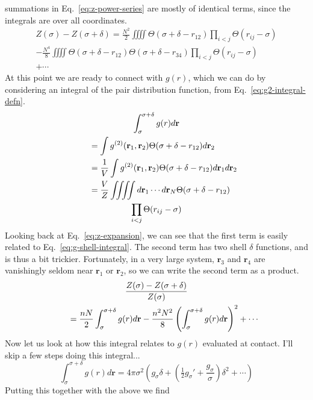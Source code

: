 \documentclass[letterpaper,twocolumn,amsmath,amssymb,pre,aps,10pt]{revtex4-1}
\newcommand{\rr}{\textbf{r}}
\begin{document}
summations in Eq.~\ref{eq:z-power-series} are mostly of identical
terms, since the integrals are over all coordinates.
\begin{multline}
  Z(\sigma)-Z(\sigma+\delta) =
  \frac{N^2}{2}\iiiint \Theta(\sigma+\delta-r_{12})
  \prod_{i<j} \Theta(r_{ij}-\sigma) \\
  - \frac{N^4}{8}\iiiint
  \Theta(\sigma+\delta-r_{12})
  \Theta(\sigma+\delta-r_{34})
  \prod_{i<j} \Theta(r_{ij}-\sigma) \\
  + \cdots \label{eq:z-expansion}
\end{multline}
At this point we are ready to connect with $g(r)$, which we can do by
considering an integral of the pair distribution function, from
Eq.~\ref{eq:g2-integral-defn}.
\begin{multline}
  \int_{\sigma}^{\sigma+\delta} g(r) d\rr\\
  \shoveleft{\quad= \int g^{(2)}(\rr_1,\rr_2)
  \Theta(\sigma+\delta-r_{12})d\rr_2} \\
  \shoveleft{\quad= \frac{1}{V}\int g^{(2)}(\rr_1,\rr_2)
  \Theta(\sigma+\delta-r_{12})d\rr_1d\rr_2} \\
  \shoveleft{\quad= \frac{V}{Z}\iiiint d\rr_1\cdots d\rr_N
  \Theta(\sigma+\delta-r_{12})}\\
  \prod_{i<j} \Theta(r_{ij}-\sigma)
  \label{eq:g-shell-integral}
\end{multline}
Looking back at Eq.~\ref{eq:z-expansion}, we can see that the first
term is easily related to Eq.~\ref{eq:g-shell-integral}.  The second
term has two shell $\delta$ functions, and is thus a bit trickier.
Fortunately, in a very large system, $\rr_3$ and $\rr_4$ are
vanishingly seldom near $\rr_1$ or $\rr_2$, so we can write the second
term as a product.
\begin{multline}
  \frac{Z(\sigma)-Z(\sigma+\delta)}{Z(\sigma)}\\
  \shoveleft{\quad= \frac{nN}{2} \int_{\sigma}^{\sigma+\delta} g(r) d\rr }
  - \frac{n^2N^2}{8} \left(\int_{\sigma}^{\sigma+\delta} g(r)
  d\rr\right)^2
  + \cdots
  \label{eq:zdiff-g}
\end{multline}
Now let us look at how this integral relates to $g(r)$ evaluated at
contact.  I'll skip a few steps doing this integral...
\begin{equation}
   \int_{\sigma}^{\sigma+\delta} g(r)
  d\rr = 4\pi\sigma^2\left(g_\sigma\delta + \left(\tfrac12g_\sigma' +
  \frac{g_\sigma}{\sigma}\right)\delta^2 + \cdots \right)
\end{equation}
Putting this together with the above we find
\end{document}
